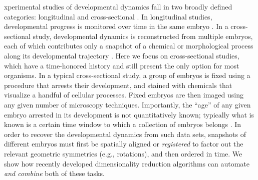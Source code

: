 \documentclass{pnastwo}
\begin{document}
\begin{article}




xperimental studies of developmental dynamics fall in two broadly defined categories: longitudinal and cross-sectional \cite{diggle2002analysis}.
%
In longitudinal studies, developmental progress is monitored over time in the same embryo \cite{roelens2013live, keller2013imaging}.
%
In a cross-sectional study, developmental dynamics is reconstructed from multiple embryos, each of which contributes only a snapshot of a chemical or morphological process along its developmental trajectory \cite{jaeger2004dynamic, peter2011gene, fowlkes2008quantitative}.
%
Here we focus on cross-sectional studies, which have a time-honored history and still present the only option for most organisms.
%
In a typical cross-sectional study, a group of embryos is fixed using a procedure that arrests their development, and stained with chemicals that visualize a handful of cellular processes.
%
Fixed embryos are then imaged using any given number of microscopy techniques.
%
Importantly, the ``age'' of any given embryo arrested in its development is not quantitatively known; typically what is known is
a certain time window to which a collection of embryos belongs \cite{ng2012large, richardson2014emage, castro2009automatic}.
%
In order to recover the developmental dynamics from such data sets, snapshots of different embryos must first be spatially aligned or {\em registered} to factor out the relevant geometric symmetries (e.g., rotations), and then ordered in time.
%
We show how recently developed dimensionality reduction algorithms can automate {\it and combine} both of these tasks.


\end{article}
\end{document}
